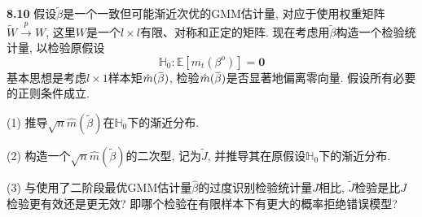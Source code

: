 \documentclass[cn,12pt,math=mtpro2,citestyle=gb7714-2015,bibstyle=gb7714-2015,twocol,mode=simple]{elegantbook}
\newcommand{\overbar}[1]{\mkern 1.5mu\overline{\mkern-1.5mu#1\mkern-1.5mu}\mkern 1.5mu}
\newcommand{\HH}{\mathbb{H}}
\newcommand{\E}{\mathbb{E}}
\newcommand{\hatm}{\hat{m}}
\begin{document}
\textbf{8.10} 假设$\tilde{\beta}$是一个一致但可能渐近次优的GMM估计量, 对应于使用权重矩阵$\tilde{W}\xrightarrow{p}W$, 这里$W$是一个$l\times l$有限、对称和正定的矩阵. 现在考虑用$\tilde{\beta}$构造一个检验统计量, 以检验原假设
$$\HH_0: \E[m_t(\beta^o)]=\mathbf{0}$$
基本思想是考虑$l\times 1$样本矩$\hatm(\overbar{\beta})$,  检验$\hatm(\overbar{\beta})$是否显著地偏离零向量. 假设所有必要的正则条件成立.

(1) 推导$\sqrt{n}\hat{m}(\tilde{\beta})$在$\HH_0$下的渐近分布.

(2) 构造一个$\sqrt{n}\hatm(\tilde{\beta})$的二次型, 记为$\tilde{J}$, 并推导其在原假设$\HH_0$下的渐近分布.

(3) 与使用了二阶段最优GMM估计量$\hat{\beta}$的过度识别检验统计量$J$相比, $\tilde{J}$检验是比$J$检验更有效还是更无效? 即哪个检验在有限样本下有更大的概率拒绝错误模型?
\end{document}
